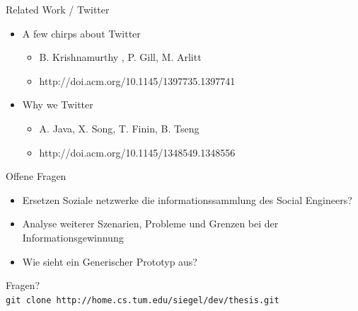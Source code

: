 \documentclass[11pt]{beamer}
\begin{document}
\begin{frame}{Related Work / Twitter}
  \begin{itemize}
    \item A few chirps about Twitter
    \begin{itemize}
      \item B. Krishnamurthy , P. Gill, M. Arlitt
      \item http://doi.acm.org/10.1145/1397735.1397741
    \end{itemize}
    \item Why we Twitter
    \begin{itemize}
      \item A. Java, X. Song, T. Finin, B. Tseng
      \item http://doi.acm.org/10.1145/1348549.1348556
    \end{itemize}
  \end{itemize}
\end{frame}

\begin{frame}{Offene Fragen}
  \begin{itemize}
    \item Ersetzen Soziale netzwerke die informationssammlung des Social Engineers?
    \item Analyse weiterer Szenarien, Probleme und Grenzen bei der Informationsgewinnung
    \item Wie sieht ein Generischer Prototyp aus?
  \end{itemize}
\end{frame}

\begin{frame}
  \begin{center}
  {\Huge Fragen?}\\

\vfill
  \texttt{git clone http://home.cs.tum.edu/siegel/dev/thesis.git}
  \end{center}
\end{frame}
\end{document}
